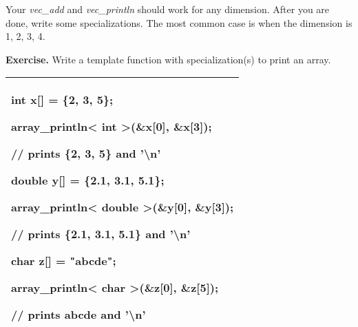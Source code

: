 \documentclass[
]{article}
\begin{document}
Your \emph{vec\_add} and \emph{vec\_println} should work for any
dimension. After you are done, write some specializations. The most
common case is when the dimension is 1, 2, 3, 4.

\textbf{Exercise.} Write a template function with specialization(s) to
print an array.

\begin{longtable}[]{@{}l@{}}
\toprule
\endhead
\begin{minipage}[t]{0.97\columnwidth}\raggedright
int x{[}{]} = \{2, 3, 5\};

array\_println\textless{} int \textgreater(\&x{[}0{]}, \&x{[}3{]});

// prints \{2, 3, 5\} and '\textbackslash n'

double y{[}{]} = \{2.1, 3.1, 5.1\};

array\_println\textless{} double \textgreater(\&y{[}0{]}, \&y{[}3{]});

// prints \{2.1, 3.1, 5.1\} and '\textbackslash n'

char z{[}{]} = "abcde";

array\_println\textless{} char \textgreater(\&z{[}0{]}, \&z{[}5{]});

// prints abcde and '\textbackslash n'\strut
\end{minipage}\tabularnewline
\bottomrule
\end{longtable}
\end{document}
